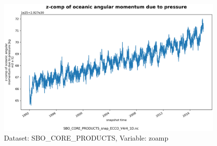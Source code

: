 \begin{figure}[H]
\centering
\includegraphics[scale=0.55]{../images/plots/oneD_plots/SBO_Core_Products/zoamp.png}
\caption{Dataset: SBO\_CORE\_PRODUCTS, Variable: zoamp}
\label{tab:table-SBO_CORE_PRODUCTS_zoamp-Plot}
\end{figure}
\pagebreak
